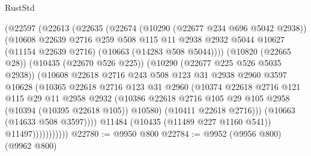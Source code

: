 \begin{lexlean}{RustStd}
\begin{coremodule}
{\begin{coremodule}
{{{{{{{{{{{{{{{{{{{{{{{{{{{{{{{{{{{{{{{{{{{{{{{{{{{{{{{{{{{{{{{{{{{{{{{{{{{{{{                      (@22597
                        (@22613
                          (@22635
                            (@22674
                              (@10290 (@22677 @234 @696 @5042 @2938))
                              (@10608
                                @22639
                                @2716
                                @259
                                @508
                                @115
                                @11
                                @2938
                                @2932
                                @5044
                                @10627
                                (@11154 @22639 @2716)
                                (@10663 (@14283 @508 @5044))))
                            (@10820 (@22665 @28))
                            (@10435 (@22670 @526 @225))
                            (@10290 (@22677 @225 @526 @5035 @2938))
                            (@10608
                              @22618
                              @2716
                              @243
                              @508
                              @123
                              @31
                              @2938
                              @2960
                              @3597
                              @10628
                              (@10365
                                @22618
                                @2716
                                @123
                                @31
                                @2960
                                (@10374
                                  @22618
                                  @2716
                                  @121
                                  @115
                                  @29
                                  @11
                                  @2958
                                  @2932
                                  (@10386
                                    @22618
                                    @2716
                                    @105
                                    @29
                                    @105
                                    @2958
                                    (@10394 (@10395 @22618 @105))
                                    @10580)
                                  (@10411 @22618 @2716)))
                              (@10663 (@14633 @508 @3597))))
                          @11484
                          (@10435 (@11489 @227 @1160 @541))
                          @11497)))))))))))
@22780 := @9950 @800
@22784 := @9952 (@9956 @800) (@9962 @800)
}}}}}}}}}}}}}}}}}}}}}}}}}}}}}}}}}}}}}}}}}}}}}}}}}}}}}}}}}}}}}}}}}}}}}}}}}}}}}}
\end{coremodule}}
\end{coremodule}
\end{lexlean}

